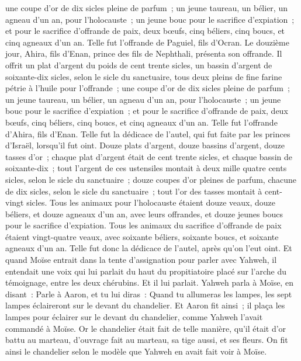 \begin{multicols}{2}
une coupe d'or de dix sicles pleine de parfum~;
un jeune taureau, un bélier, un agneau d'un an, pour l'holocauste~;
un jeune bouc pour le sacrifice d'expiation~;
et pour le sacrifice d'offrande de paix, deux bœufs, cinq béliers, cinq boucs, et cinq agneaux d'un an. Telle fut l'offrande de Paguiel, fils d'Ocran.
Le douzième jour, Ahira, fils d'Enan, prince des fils de Nephthali, présenta son offrande.
Il offrit un plat d'argent du poids de cent trente sicles, un bassin d'argent de soixante-dix sicles, selon le sicle du sanctuaire, tous deux pleins de fine farine pétrie à l'huile pour l'offrande~;
une coupe d'or de dix sicles pleine de parfum~;
un jeune taureau, un bélier, un agneau d'un an, pour l'holocauste~;
un jeune bouc pour le sacrifice d'expiation~;
et pour le sacrifice d'offrande de paix, deux bœufs, cinq béliers, cinq boucs, et cinq agneaux d'un an. Telle fut l'offrande d'Ahira, fils d'Enan.
Telle fut la dédicace de l'autel, qui fut faite par les princes d'Israël, lorsqu'il fut oint. Douze plats d'argent, douze bassins d'argent, douze tasses d'or~;
chaque plat d'argent était de cent trente sicles, et chaque bassin de soixante-dix~; tout l'argent de ces ustensiles montait à deux mille quatre cents sicles, selon le sicle du sanctuaire~;
douze coupes d'or pleines de parfum, chacune de dix sicles, selon le sicle du sanctuaire~; tout l'or des tasses montait à cent-vingt sicles.
Tous les animaux pour l'holocauste étaient douze veaux, douze béliers, et douze agneaux d'un an, avec leurs offrandes, et douze jeunes boucs pour le sacrifice d'expiation.
Tous les animaux du sacrifice d'offrande de paix étaient vingt-quatre veaux, avec soixante béliers, soixante boucs, et soixante agneaux d'un an. Telle fut donc la dédicace de l'autel, après qu'on l'eut oint.
Et quand Moïse entrait dans la tente d'assignation pour parler avec Yahweh, il entendait une voix qui lui parlait du haut du propitiatoire placé sur l'arche du témoignage, entre les deux chérubins. Et il lui parlait.
\VerseOne{}Yahweh parla à Moïse, en disant~:
Parle à Aaron, et tu lui diras~: Quand tu allumeras les lampes, les sept lampes éclaireront sur le devant du chandelier.
Et Aaron fit ainsi~; il plaça les lampes pour éclairer sur le devant du chandelier, comme Yahweh l'avait commandé à Moïse.
Or le chandelier était fait de telle manière, qu'il était d'or battu au marteau, d'ouvrage fait au marteau, sa tige aussi, et ses fleurs. On fit ainsi le chandelier selon le modèle que Yahweh en avait fait voir à Moïse.

\end{multicols}
